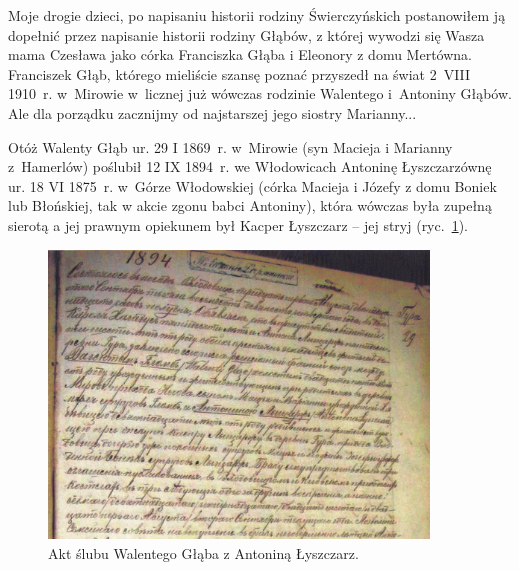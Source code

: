 Moje drogie dzieci, po napisaniu historii rodziny Świerczyńskich postanowiłem ją dopełnić przez napisanie historii rodziny Głąbów, z której wywodzi się Wasza mama Czesława jako córka Franciszka Głąba i Eleonory z domu Mertówna. Franciszek Głąb, którego mieliście szansę poznać przyszedł na świat 2~VIII 1910~r. w~Mirowie w~licznej już wówczas rodzinie Walentego i~Antoniny Głąbów. Ale dla porządku zacznijmy od najstarszej jego siostry Marianny...

Otóż Walenty Głąb ur. 29 I 1869~r. w~Mirowie (syn Macieja i Marianny z~Hamerlów) poślubił 12 IX 1894~r. we Włodowicach Antoninę Łyszczarzównę ur. 18 VI 1875~r. w~Górze Włodowskiej (córka Macieja i Józefy z domu Boniek lub Błońskiej, tak w akcie zgonu babci Antoniny), która wówczas była zupełną sierotą a jej prawnym opiekunem był Kacper Łyszczarz -- jej stryj (ryc.~\ref{rys:akt_slubu_walentego_glaba_i_antoniny_lyszczarz}).

\begin{figure}[!h]
\begin{center}
\includegraphics[width=0.9\textwidth]{zdjecia/akt_slubu_walentego_glaba_i_antoniny_lyszczarz.jpg}
\caption{Akt ślubu Walentego Głąba z Antoniną Łyszczarz.}
\label{rys:akt_slubu_walentego_glaba_i_antoniny_lyszczarz}
\end{center}
\end{figure}
